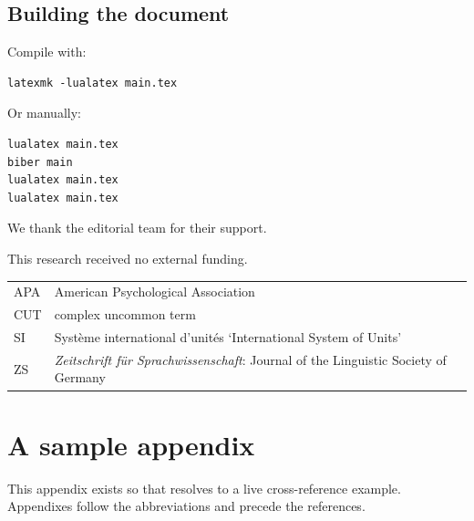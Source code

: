 \documentclass{zsarticle}
\begin{document}
\subsection{Building the document}\label{sec:building}

Compile with:
\begin{verbatim}
latexmk -lualatex main.tex
\end{verbatim}

Or manually:
\begin{verbatim}
lualatex main.tex
biber main
lualatex main.tex
lualatex main.tex
\end{verbatim}


\begin{acknowledgements}
We thank the editorial team for their support.
\end{acknowledgements}

\begin{funding}
This research received no external funding.
\end{funding}

\begin{abbreviations}
\begin{tabular}{@{}ll@{}}
APA & American Psychological Association\\
CUT & complex uncommon term\\
SI  & Syst\`eme international d'unit\'es `International System of Units'\\
ZS  & \textit{Zeitschrift für Sprachwissenschaft}: Journal of the Linguistic Society of Germany
\end{tabular}
\end{abbreviations}

\appendix
\section{A sample appendix}\label{app:sample}

This appendix exists so that  resolves to a live cross-reference example. Appendixes follow the abbreviations and precede the references.

\printbibliography
\end{document}
